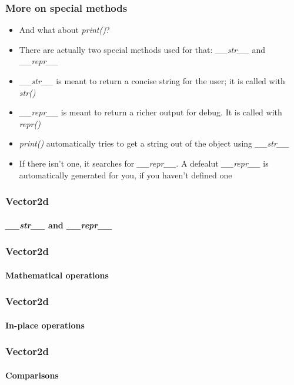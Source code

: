 \documentclass[9pt]{beamer}
\begin{document}
\begin{frame}
  \frametitle{More on special methods}
  
  \begin{itemize}
    \item And what about \emph{print()}?
    \item There are actually two special methods used for that: \emph{\_\_str\_\_} and \emph{\_\_repr\_\_}
    \medskip
    \item \emph{\_\_str\_\_} is meant to return a concise string for the user; it is called with \emph{str()}
    \medskip
    \item \emph{\_\_repr\_\_} is meant to return a richer output for debug. It is called with \emph{repr()}
    \medskip
    \item \emph{print()} automatically tries to get a string out of the object using \emph{\_\_str\_\_}
    \medskip
    \item If there isn't one, it searches for \emph{\_\_repr\_\_}. A defealut \emph{\_\_repr\_\_}
          is automatically generated for you, if you haven't defined one
  \end{itemize}
  
\end{frame}


\begin{frame}
  \frametitle{Vector2d}
  \framesubtitle{\emph{\_\_str\_\_} and \emph{\_\_repr\_\_}}
  
\end{frame}


\begin{frame}
  \frametitle{Vector2d}
  \framesubtitle{Mathematical operations}
  
\end{frame}


\begin{frame}
  \frametitle{Vector2d}
  \framesubtitle{In-place operations}
  
\end{frame}


\begin{frame}
  \frametitle{Vector2d}
  \framesubtitle{Comparisons}
  
\end{frame}
\end{document}
